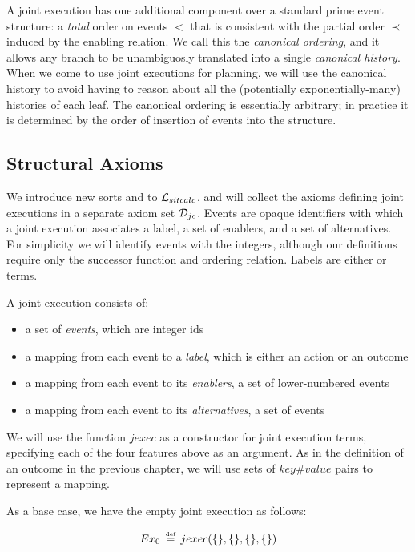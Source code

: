 A joint execution has one additional component over a standard prime
event structure: a \emph{total} order on events $<$ that is consistent
with the partial order $\prec$ induced by the enabling relation.
We call this the \emph{canonical ordering}, and it allows any branch
to be unambiguosly translated into a single \emph{canonical history}.
When we come to use joint executions for planning, we will use the
canonical history to avoid having to reason about all the (potentially
exponentially-many) histories of each leaf. The canonical ordering
is essentially arbitrary; in practice it is determined by the order
of insertion of events into the structure.


\subsection{Structural Axioms}

We introduce new sorts and  to $\mathcal{L}_{sitcalc}$,
and will collect the axioms defining joint executions in a separate
axiom set $\mathcal{D}_{je}$. Events are opaque identifiers with which a
joint execution associates a label, a set of enablers, and a set of
alternatives. For simplicity we will identify events with the integers,
although our definitions require only the successor function and ordering
relation. Labels are either  or  terms.

A joint execution consists of:

\begin{itemize}
\item a set of \emph{events}, which are integer ids 
\item a mapping from each event to a \emph{label}, which is either an action
or an outcome 
\item a mapping from each event to its \emph{enablers}, a set of lower-numbered
events 
\item a mapping from each event to its \emph{alternatives}, a set of events 
\end{itemize}
We will use the function $jexec$ as a constructor for joint execution
terms, specifying each of the four features above as an argument.
As in the definition of an outcome in the previous chapter, we will
use sets of $key\#value$ pairs to represent a mapping.

As a base case, we have the empty joint execution as follows:

\[
Ex_{0}\,\stackrel{\mbox{\tiny def}}{=}\, jexec(\{\},\{\},\{\},\{\})\]



